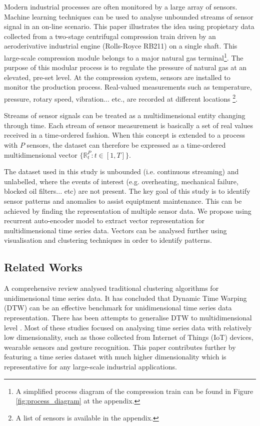 \documentclass[runningheads]{llncs}
\begin{document}
Modern industrial processes are often monitored by a large array of sensors. Machine learning techniques can be used to analyse unbounded streams of sensor signal in an on-line scenario. This paper illustrates the idea using propietary data collected from a two-stage centrifugal compression train driven by an aeroderivative industrial engine (Rolls-Royce RB211) on a single shaft. This large-scale compression module belongs to a major natural gas terminal\footnote{A simplified process diagram of the compression train can be found in Figure \ref{fig:process_diagram} at the appendix.}. The purpose of this modular process is to regulate the pressure of natural gas at an elevated, pre-set level. At the compression system, sensors are installed to monitor the production process. Real-valued measurements such as temperature, pressure, rotary speed, vibration... etc., are recorded at different locations \footnote{A list of sensors is available in the appendix.}.

Streams of sensor signals can be treated as a multidimensional entity changing through time. Each stream of sensor measurement is basically a set of real values received in a time-ordered fashion. When this concept is extended to a process with \(P\) sensors, the dataset can therefore be expressed as a time-ordered multidimensional vector \( \{ \mathbb{R}_t^P:t\in [1,T] \} \).

The dataset used in this study is unbounded (i.e. continuous streaming) and unlabelled, where the events of interest (e.g. overheating, mechanical failure, blocked oil filters... etc) are not present. The key goal of this study is to identify sensor patterns and anomalies to assist equiptment maintenance. This can be achieved by finding the representation of multiple sensor data. We propose using recurrent auto-encoder model to extract vector representation for multidimensional time series data. Vectors can be analysed further using visualisation and clustering techniques in order to identify patterns.

\subsection{Related Works}

A comprehensive review \cite{bakeoff} analysed traditional clustering algorithms for unidimensional time series data. It has concluded that Dynamic Time Warping (DTW) can be an effective benchmark for unidimensional time series data representation. There has been attempts to generalise DTW to multidimensional level \cite{vlachos,gillian,holt,ko,petitjean,liu,wang,Shokoohi,giorgino}. Most of these studies focused on analysing time series data with relatively low dimensionality, such as those collected from Internet of Things (IoT) devices, wearable sensors and gesture recognition. This paper contributes further by featuring a time series dataset with much higher dimensionality which is representative for any large-scale industrial applications.
\end{document}
